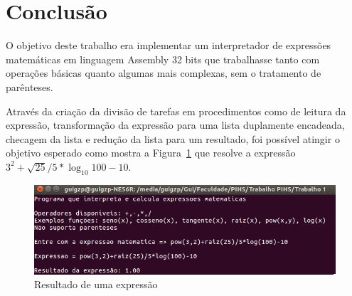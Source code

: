 \documentclass[12pt]{article}
\begin{document}
\section*{Conclusão}

O objetivo deste trabalho era implementar um interpretador de expressões matemáticas em linguagem Assembly 32 bits que trabalhasse tanto com  operações básicas quanto algumas mais complexas, sem o tratamento de parênteses.

Através da criação da divisão de tarefas em procedimentos como de leitura da expressão, transformação da expressão para uma lista duplamente encadeada, checagem da lista e redução da lista para um resultado, foi possível atingir o objetivo esperado como mostra a Figura~\ref{fig:resultado} que resolve a expressão ${3^{2} + \sqrt{25}/{5} * {\log_{10} 100} -10 }$.

\begin{figure}[H]
\centering
\includegraphics[width=\textwidth]{Imagens/resultado.png}
\caption{Resultado de uma expressão}
\label{fig:resultado}
\end{figure}

\nocite{*}



\end{document}
